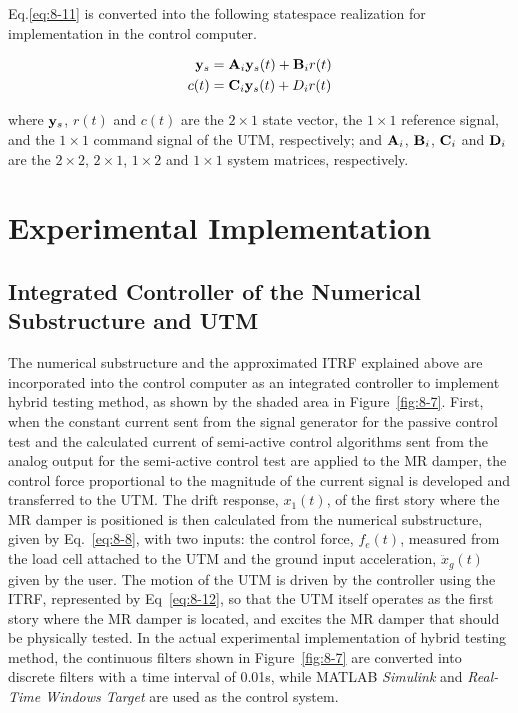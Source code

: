Eq.\eqref{eq:8-11} is converted into the following statespace realization for implementation in the control computer.

\begin{equation}\label{eq:8-12}
\begin{aligned}
\mathbf{y}_{s} & = \mathbf{A}_{i}\mathbf{y}_{s}(t) + \mathbf{B}_{i}r(t) \\
c(t) &= \mathbf{C}_{i}\mathbf{y}_{s}(t) + D_{i}r(t)
\end{aligned}
\end{equation}

where $\mathbf{y}_{s}$, $r(t)$ and $c(t)$ are the $2\times1$ state vector, the $1\times1$ reference signal, and the $1\times1$ command signal of the UTM, respectively; and $\mathbf{A}_{i}$, $\mathbf{B}_{i}$, $\mathbf{C}_{i}$ and $\mathbf{D}_{i}$ are the $2\times2$, $2\times1$, $1\times2$ and $1\times1$ system matrices, respectively.

\section{Experimental Implementation}
\subsection{Integrated Controller of the Numerical Substructure and UTM}

The numerical substructure and the approximated ITRF explained above are incorporated into the control computer as an integrated controller to implement hybrid testing method, as shown by the shaded area in Figure~\ref{fig:8-7}. First, when the constant current sent from the signal generator for the passive control test and the calculated current of semi-active control algorithms sent from the analog output for the semi-active control test are applied to the MR damper, the control force proportional to the magnitude of the current signal is developed and transferred to the UTM. The drift response, $x_{1}(t)$, of the first story where the MR damper is positioned is then calculated from the numerical substructure, given by Eq.~\eqref{eq:8-8}, with two inputs: the control force, $f_{e}(t)$, measured from the load cell attached to the UTM and the ground input acceleration, $\ddot{x}_{g}(t)$ given by the user. The motion of the UTM is driven by the controller using the ITRF, represented by Eq~\eqref{eq:8-12}, so that the UTM itself operates as the first story where the MR damper is located, and excites the MR damper that should be physically tested. In the actual experimental implementation of hybrid testing method, the continuous filters shown in Figure~\ref{fig:8-7} are converted into discrete filters with a time interval of 0.01s, while MATLAB \textit{Simulink}\citep{simulink2009version} and \textit{Real-Time Windows Target}\citep{targetuser} are used as the control system.

